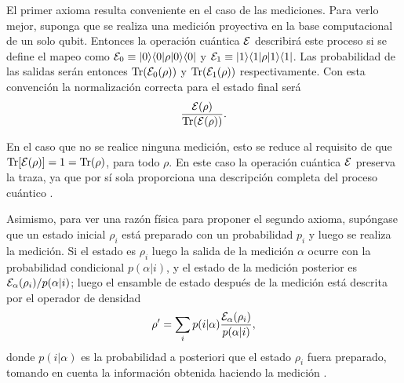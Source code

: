El primer axioma resulta conveniente en  el caso de las mediciones. Para verlo
mejor, suponga que se realiza una medición
proyectiva en la base computacional de un solo qubit. Entonces la operación
cuántica $\mathcal{E}$ describirá este proceso si se define el mapeo como
$\mathcal{E}_0\equiv|0\rangle \langle0|\rho |0\rangle \langle 0|$ y $\mathcal{E}_1\equiv|1\rangle \langle1|\rho |1\rangle \langle 1|$.
Las probabilidad de las salidas serán entonces ${\rm Tr} (\mathcal{E}_0(\rho))$ y ${\rm Tr}
(\mathcal{E}_1(\rho))$ respectivamente.  Con esta convención la normalización correcta
para el estado final será \[\dfrac{\mathcal{E}(\rho)}{{\rm Tr} (\mathcal{E} (\rho))}.\]

En el caso que no se realice ninguna medición, esto se reduce al requisito de
que ${\rm Tr}[\mathcal{E}(\rho)] = 1 = {\rm Tr}(\rho)$, para todo $\rho$. En este caso la
operación cuántica $\mathcal{E}$ preserva la traza, ya que por sí sola proporciona una
descripción completa del proceso cuántico 
{\cite{nielsen_chuang_2010}}.

\begin{comment}
Asimismo, una razón física para proponer el segundo axioma, es que se espera que la evolución de un estado cuántico sea lineal debido a que de esa forma es compatible con la interpretación del operador de densidad como un ensamble de posibles estados. Supóngase que $\E$ mapea al estado inicial $\rho$  en el tiempo $t=0$ al estado final al tiempo $t=T$, el estado $\rho_i$ es preparado con una probabilidad $p_i$. Luego el estado de evolución temporal en $t = T$ será $\E(\rho_i )$ con probabilidad $p_i$, por lo tanto el estado final $\rho'$ evoluciona como \begin{equation}
\rho'= \sum_i p_i \E (\rho_i).
\end{equation}

Por otro lado, el estado inicial es descrito por $\sum_i p_i \rho$, que evoluciona así 
\begin{equation}
    \rho'= \E\left(\sum_i p_i \rho_i\right).
\end{equation} Igualando las dos ecuaciones anteriores, se tiene  que $\E$ debe actuar linealmente, en combinaciones convexas de estados {\cite{preskill2020quantum}}.
\end{comment}

Asimismo, para ver una razón física para proponer el segundo axioma, supóngase que un estado inicial $\rho_i$ está preparado con un probabilidad $p_i$ y luego se realiza la medición. Si el estado es $\rho_i $ luego la salida de la medición  $\alpha$ ocurre con la probabilidad condicional $p(\alpha|i)$, y el estado de la medición  posterior es $\mathcal{E}_\alpha(\rho_i)/p(\alpha|i)$; luego el ensamble de estado después de la medición está descrita por el operador de densidad 
\begin{equation}\label{lineal_y_convexo}
    \rho'=\sum_i p(i|\alpha)\dfrac{\mathcal{E}_\alpha(\rho_i)}{p(\alpha|i)},
\end{equation}
donde $p(i|\alpha)$ es la probabilidad a posteriori que el estado $\rho_i$
fuera preparado, tomando en cuenta la información obtenida haciendo la medición
{\cite{preskill2020quantum}}. 

